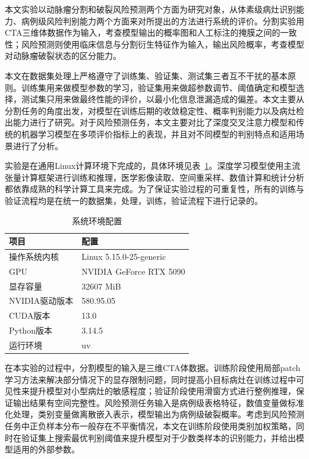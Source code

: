 
本文实验以动脉瘤分割和破裂风险预测两个方面为研究对象，从体素级病灶识别能力、病例级风险判别能力两个方面来对所提出的方法进行系统的评价。分割实验用CTA三维体数据作为输入，考查模型输出的概率图和人工标注的掩膜之间的一致性；风险预测则使用临床信息与分割衍生特征作为输入，输出风险概率，考查模型对动脉瘤破裂状态的区分能力。

本文在数据集处理上严格遵守了训练集、验证集、测试集三者互不干扰的基本原则。训练集用来做模型参数的学习，验证集用来做超参数调节、阈值确定和模型选择，测试集只用来做最终性能的评价，以最小化信息泄漏造成的偏差。本文主要从分割任务的角度出发，对模型在训练后期的收敛稳定性、概率判别能力以及病灶检出能力进行了研究。对于风险预测任务，本文主要对比了深度交叉注意力模型和传统的机器学习模型在多项评价指标上的表现，并且对不同模型的判别特点和适用场景进行了分析。




实验是在通用Linux计算环境下完成的，具体环境见表~\ref{tab:env_setup}。深度学习模型使用主流张量计算框架进行训练和推理，医学影像读取、空间重采样、数值计算和统计分析都依靠成熟的科学计算工具来完成。为了保证实验过程的可重复性，所有的训练与验证流程均是在统一的数据集，处理，训练，验证流程下进行记录的。

\begin{table}[!htbp]
\centering
\caption{系统环境配置}
\label{tab:env_setup}
\small
\renewcommand{\arraystretch}{0.88}
\begin{tabular}{ll}
\toprule
项目 & 配置 \\
\midrule
操作系统内核 & Linux 5.15.0-25-generic \\
GPU & NVIDIA GeForce RTX 5090 \\
显存容量 & 32607 MiB \\
NVIDIA驱动版本 & 580.95.05 \\
CUDA版本 & 13.0 \\
Python版本 & 3.14.5 \\
运行环境 & uv \\
\bottomrule
\end{tabular}
\normalsize
\renewcommand{\arraystretch}{1}
\end{table}

在本实验的过程中，分割模型的输入是三维CTA体数据。训练阶段使用局部patch学习方法来解决部分情况下的显存限制问题，同时提高小目标病灶在训练过程中可见性来提升模型对小型病灶的敏感程度；验证阶段使用滑窗方式进行整例推理，保证输出结果有空间完整性。风险预测任务输入是病例级表格特征，数值变量做标准化处理，类别变量做离散嵌入表示，模型输出为病例级破裂概率。考虑到风险预测任务中正负样本分布一般存在不平衡情况，本文在训练阶段使用类别加权策略，同时在验证集上搜索最优判别阈值来提升模型对于少数类样本的识别能力，并给出模型适用的外部参数。

